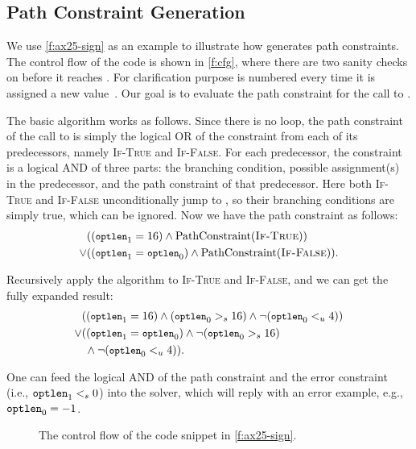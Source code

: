 \subsection{Path Constraint Generation}
\label{s:gen:path}

We use \autoref{f:ax25-sign} as an example to illustrate how \sys
generates path constraints.  The control flow of the code is shown
in \autoref{f:cfg}, where there are two sanity checks on 
before it reaches .  For clarification purpose
 is numbered every time it is assigned a new
value~\cite[\chapterautorefname~8.11]{whale}.  Our goal is to
evaluate the path constraint for the call to .

The basic algorithm works as follows.  Since there is no loop, the
path constraint of the call to  is simply the
logical OR of the constraint from each of its predecessors, namely
\textsc{If-True} and \textsc{If-False}.  For each predecessor, the
constraint is a logical AND of three parts: the branching condition,
possible assignment(s) in the predecessor, and the path constraint
of that predecessor.  Here both \textsc{If-True} and \textsc{If-False}
unconditionally jump to , so their branching
conditions are simply true, which can be ignored.  Now we have the
path constraint as follows:
\newcommand{\optlen}{{\small \texttt{optlen}}}
\newcommand{\pc}{\textrm{PathConstraint}}
%
\begin{align*}
& ((\optlen_1 = 16) \land \pc(\textsc{If-True})) \\
\lor & ((\optlen_1 = \optlen_0) \land \pc(\textsc{If-False})).
\end{align*}

Recursively apply the algorithm to \textsc{If-True} and \textsc{If-False},
and we can get the fully expanded result:
%
\begin{align*}
& ((\optlen_1 = 16) \land (\optlen_0 >_s 16)
    \land \neg(\optlen_0 <_u 4)) \\
\lor & ((\optlen_1 = \optlen_0) \land \neg(\optlen_0 >_s 16) \\
     & \; \land \neg(\optlen_0 <_u 4)).
\end{align*}

One can feed the logical AND of the path constraint and the error
constraint (i.e., $\texttt{optlen}_1 <_s 0$) into the solver, which
will reply with an error example, e.g., $\texttt{optlen}_0 = -1$.

\begin{figure}
\centering
\resizebox{\linewidth}{!}{

}
\caption{The control flow of the code snippet in \autoref{f:ax25-sign}.}
\label{f:cfg}
\end{figure}

